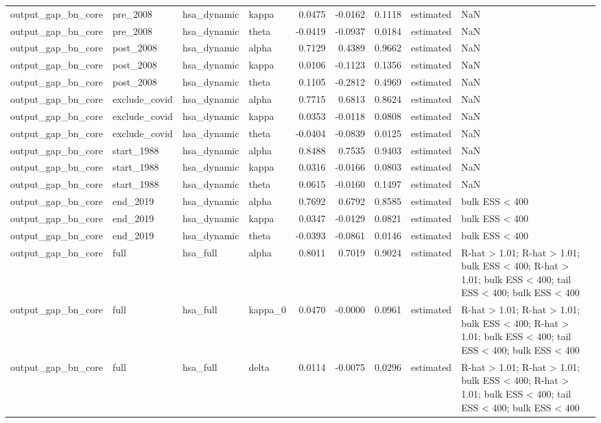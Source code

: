 \begin{tabular}{llllrrrll}
output\_gap\_bn\_core & pre\_2008 & hsa\_dynamic & kappa & 0.0475 & -0.0162 & 0.1118 & estimated & NaN \\
output\_gap\_bn\_core & pre\_2008 & hsa\_dynamic & theta & -0.0419 & -0.0937 & 0.0184 & estimated & NaN \\
output\_gap\_bn\_core & post\_2008 & hsa\_dynamic & alpha & 0.7129 & 0.4389 & 0.9662 & estimated & NaN \\
output\_gap\_bn\_core & post\_2008 & hsa\_dynamic & kappa & 0.0106 & -0.1123 & 0.1356 & estimated & NaN \\
output\_gap\_bn\_core & post\_2008 & hsa\_dynamic & theta & 0.1105 & -0.2812 & 0.4969 & estimated & NaN \\
output\_gap\_bn\_core & exclude\_covid & hsa\_dynamic & alpha & 0.7715 & 0.6813 & 0.8624 & estimated & NaN \\
output\_gap\_bn\_core & exclude\_covid & hsa\_dynamic & kappa & 0.0353 & -0.0118 & 0.0808 & estimated & NaN \\
output\_gap\_bn\_core & exclude\_covid & hsa\_dynamic & theta & -0.0404 & -0.0839 & 0.0125 & estimated & NaN \\
output\_gap\_bn\_core & start\_1988 & hsa\_dynamic & alpha & 0.8488 & 0.7535 & 0.9403 & estimated & NaN \\
output\_gap\_bn\_core & start\_1988 & hsa\_dynamic & kappa & 0.0316 & -0.0166 & 0.0803 & estimated & NaN \\
output\_gap\_bn\_core & start\_1988 & hsa\_dynamic & theta & 0.0615 & -0.0160 & 0.1497 & estimated & NaN \\
output\_gap\_bn\_core & end\_2019 & hsa\_dynamic & alpha & 0.7692 & 0.6792 & 0.8585 & estimated & bulk ESS < 400 \\
output\_gap\_bn\_core & end\_2019 & hsa\_dynamic & kappa & 0.0347 & -0.0129 & 0.0821 & estimated & bulk ESS < 400 \\
output\_gap\_bn\_core & end\_2019 & hsa\_dynamic & theta & -0.0393 & -0.0861 & 0.0146 & estimated & bulk ESS < 400 \\
output\_gap\_bn\_core & full & hsa\_full & alpha & 0.8011 & 0.7019 & 0.9024 & estimated & R-hat > 1.01; R-hat > 1.01; bulk ESS < 400; R-hat > 1.01; bulk ESS < 400; tail ESS < 400; bulk ESS < 400 \\
output\_gap\_bn\_core & full & hsa\_full & kappa\_0 & 0.0470 & -0.0000 & 0.0961 & estimated & R-hat > 1.01; R-hat > 1.01; bulk ESS < 400; R-hat > 1.01; bulk ESS < 400; tail ESS < 400; bulk ESS < 400 \\
output\_gap\_bn\_core & full & hsa\_full & delta & 0.0114 & -0.0075 & 0.0296 & estimated & R-hat > 1.01; R-hat > 1.01; bulk ESS < 400; R-hat > 1.01; bulk ESS < 400; tail ESS < 400; bulk ESS < 400 \\

\end{tabular}
